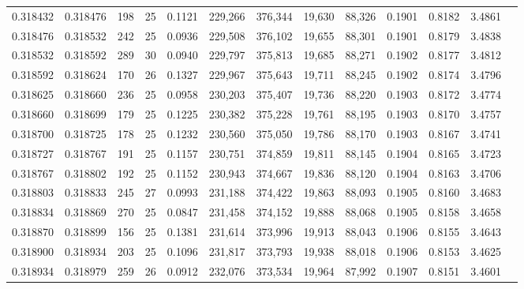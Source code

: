\begin{tabular}{rrrrrrrrrrrrr}
0.318432 & 0.318476 &   198 &  25 &                                     0.1121 & 229,266 & 376,344 &  19,630 &  88,326 & 0.1901 & 0.8182 & 3.4861 \\
0.318476 & 0.318532 &   242 &  25 &                                     0.0936 & 229,508 & 376,102 &  19,655 &  88,301 & 0.1901 & 0.8179 & 3.4838 \\
0.318532 & 0.318592 &   289 &  30 &                                     0.0940 & 229,797 & 375,813 &  19,685 &  88,271 & 0.1902 & 0.8177 & 3.4812 \\
0.318592 & 0.318624 &   170 &  26 &                                     0.1327 & 229,967 & 375,643 &  19,711 &  88,245 & 0.1902 & 0.8174 & 3.4796 \\
0.318625 & 0.318660 &   236 &  25 &                                     0.0958 & 230,203 & 375,407 &  19,736 &  88,220 & 0.1903 & 0.8172 & 3.4774 \\
0.318660 & 0.318699 &   179 &  25 &                                     0.1225 & 230,382 & 375,228 &  19,761 &  88,195 & 0.1903 & 0.8170 & 3.4757 \\
0.318700 & 0.318725 &   178 &  25 &                                     0.1232 & 230,560 & 375,050 &  19,786 &  88,170 & 0.1903 & 0.8167 & 3.4741 \\
0.318727 & 0.318767 &   191 &  25 &                                     0.1157 & 230,751 & 374,859 &  19,811 &  88,145 & 0.1904 & 0.8165 & 3.4723 \\
0.318767 & 0.318802 &   192 &  25 &                                     0.1152 & 230,943 & 374,667 &  19,836 &  88,120 & 0.1904 & 0.8163 & 3.4706 \\
0.318803 & 0.318833 &   245 &  27 &                                     0.0993 & 231,188 & 374,422 &  19,863 &  88,093 & 0.1905 & 0.8160 & 3.4683 \\
0.318834 & 0.318869 &   270 &  25 &                                     0.0847 & 231,458 & 374,152 &  19,888 &  88,068 & 0.1905 & 0.8158 & 3.4658 \\
0.318870 & 0.318899 &   156 &  25 &                                     0.1381 & 231,614 & 373,996 &  19,913 &  88,043 & 0.1906 & 0.8155 & 3.4643 \\
0.318900 & 0.318934 &   203 &  25 &                                     0.1096 & 231,817 & 373,793 &  19,938 &  88,018 & 0.1906 & 0.8153 & 3.4625 \\
0.318934 & 0.318979 &   259 &  26 &                                     0.0912 & 232,076 & 373,534 &  19,964 &  87,992 & 0.1907 & 0.8151 & 3.4601 \\

\end{tabular}
